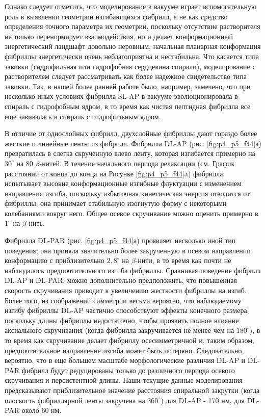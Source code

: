     Однако следует отметить, что моделирование в вакууме играет вспомогательную роль в выявлении геометрии изгибающихся фибрилл, а не как средство определения точного параметра их геометрии, поскольку отсутствие растворителя не только перенормирует взаимодействия, но и делает конформационный энергетический ландшафт довольно неровным, начальная планарная конформация фибриллы энергетически очень неблагоприятна и нестабильна. Что касается типа завивки (гидрофильная или гидрофобная сердцевина спирали), моделирование с растворителем следует рассматривать как более надежное свидетельство типа завивки. Так, в нашей более ранней работе \cite{shaytan_self-organizing_2011} было, например, замечено, что при несколько иных условиях фибрилла SL-AP в вакууме эволюционировала в спираль с гидрофобным ядром, в то время как чистая пептидная фибрилла все еще завивалась в спираль с гидрофильным ядром.

    В отличие от однослойных фибрилл, двухслойные фибриллы дают гораздо более жесткие и линейные ленты из фибрилл. Фибрилла DL-AP (рис. \ref{fig:p4_p5_f44}а) превратилась в слегка скрученную влево ленту, которая изгибается примерно на $30^{\circ}$ на 80 $\beta$-нитей. В течение начального периода релаксации (см. График расстояний от конца до конца на Рисунке \ref{fig:p4_p5_f44}a) фибрилла испытывает высокие конформационные изгибные флуктуации с изменением направления изгиба, поскольку избыточная кинетическая энергия отводится от фибриллы, она принимает стабильную изогнутую форму с некоторыми колебаниями вокруг него. Общее осевое скручивание можно оценить примерно в $1^{\circ}$ на $\beta$-нить.
    
 
    Фибрилла DL-PAR (рис. \ref{fig:p4_p5_f44}а) проявляет несколько иной тип поведения; она приняла значительно более закрученную в осевом направлении конформацию с приблизительно $2,8^{\circ}$ на $\beta$-нити, в то время как почти не наблюдалось предпочтительного изгиба фибриллы. Сравнивая поведение фибрилл DL-AP и DL-PAR, можно дополнительно предположить, что повышенная скорость скручивания приводит к увеличению жесткости фибриллы на изгиб. Более того, из соображений симметрии весьма вероятно, что наблюдаемому изгибу фибриллы DL-AP частично способствуют эффекты конечного размера, поскольку длины фибриллы недостаточно, чтобы проявить полное влияние аксиального скручивания (когда фибрилла закручивается не менее чем на $180^{\circ}$), в то время как скручивание делает фибриллу осесимметричной и, таким образом, предпочтительное направление изгиба может быть потеряно. Следовательно, вероятно, что в еще большем масштабе морфологические различия DL-AP и DL-PAR фибрилл будут редуцированы только до различного периода осевого скручивания и персистентной длины. Наши текущие данные моделирования предсказывают приблизительное значение расстояния спиральной закрутки (когда плоскость фибриллярной ленты закручена на $360^{\circ}$) для DL-AP - 170 нм, для DL-PAR около 60 нм. 


